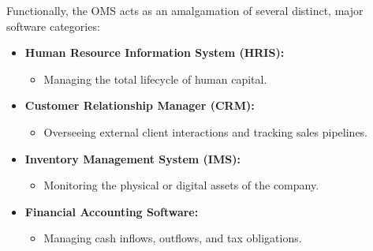 ﻿\documentclass[12pt,a4paper]{report}
\begin{document}
Functionally, the OMS acts as an amalgamation of several distinct, major software categories:
\begin{itemize}
    \item \textbf{Human Resource Information System (HRIS):}
    \begin{itemize}
        \item Managing the total lifecycle of human capital.
    \end{itemize}
    \item \textbf{Customer Relationship Manager (CRM):}
    \begin{itemize}
        \item Overseeing external client interactions and tracking sales pipelines.
    \end{itemize}
    \item \textbf{Inventory Management System (IMS):}
    \begin{itemize}
        \item Monitoring the physical or digital assets of the company.
    \end{itemize}
    \item \textbf{Financial Accounting Software:}
    \begin{itemize}
        \item Managing cash inflows, outflows, and tax obligations.
    \end{itemize}
\end{itemize}
\end{document}
